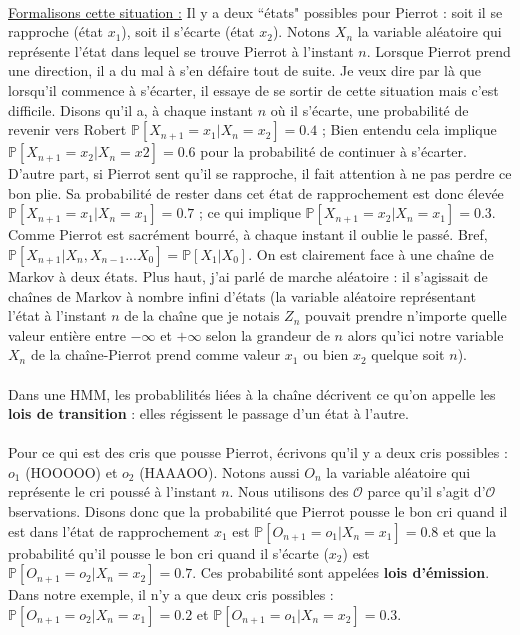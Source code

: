 \documentclass{article}
\begin{document}
\\
\underline{Formalisons cette situation :} Il y a deux ``états" possibles pour Pierrot : soit il se rapproche (état $x_1$), soit il s'écarte (état $x_2$). Notons $X_n$ la variable aléatoire qui représente l'état dans lequel se trouve Pierrot à l'instant $n$. Lorsque Pierrot prend une direction, il a du mal à s'en défaire tout de suite. Je veux dire par là que lorsqu'il commence à s'écarter, il essaye de se sortir de cette situation mais c'est difficile. Disons qu'il a, à chaque instant $n$ où il s'écarte, une probabilité de revenir vers Robert $\mathbb{P}[X_{n+1} = x_1 \vert X_n=x_2] = 0.4$ ; Bien entendu cela implique $\mathbb{P}[X_{n+1} = x_2 \vert X_n=x2] = 0.6$ pour la probabilité de continuer à s'écarter. D'autre part, si Pierrot sent qu'il se rapproche, il fait attention à ne pas perdre ce bon plie. Sa probabilité de rester dans cet état de rapprochement est donc élevée $\mathbb{P}[X_{n+1} = x_1 \vert X_n=x_1] = 0.7$ ; ce qui implique $\mathbb{P}[X_{n+1} = x_2 \vert X_n=x_1] = 0.3$. Comme Pierrot est sacrément bourré, à chaque instant il oublie le passé. Bref, $\mathbb{P}[X_{n+1} \vert X_n, X_{n-1} ... X_0] = \mathbb{P}[X_{1} \vert X_0]$. On est clairement face à une chaîne de Markov à deux états. Plus haut, j'ai parlé de marche aléatoire : il s'agissait de chaînes de Markov à nombre infini d'états (la variable aléatoire représentant l'état à l'instant $n$ de la chaîne que je notais $Z_n$ pouvait prendre n'importe quelle valeur entière entre $-\infty$ et $+\infty$ selon la grandeur de $n$ alors qu'ici notre variable $X_n$ de la chaîne-Pierrot prend comme valeur $x_1$ ou bien $x_2$ quelque soit $n$). \\
\\
Dans une HMM, les probablilités liées à la chaîne décrivent ce qu'on appelle les
\textbf{lois de transition} : elles régissent le passage d'un état à l'autre. \\
\\
Pour ce qui est des cris que pousse Pierrot, écrivons qu'il y a deux cris  possibles : $o_1$ (HOOOOO) et $o_2$ (HAAAOO). Notons aussi $O_n$ la variable aléatoire qui représente le cri poussé à l'instant $n$. Nous utilisons des $\mathcal{O}$ parce qu'il s'agit d'$\mathcal{O}$bservations. Disons donc que la probabilité que Pierrot pousse le bon cri quand il est dans l'état de rapprochement $x_1$ est $\mathbb{P}[O_{n+1} = o_1 \vert X_n=x_1] = 0.8$ et que la probabilité qu'il pousse le bon cri quand il s'écarte ($x_2$) est $\mathbb{P}[O_{n+1} = o_2 \vert X_n=x_2] = 0.7$. Ces probabilité sont appelées \textbf{lois d'émission}. Dans notre exemple, il n'y a que deux cris possibles : $\mathbb{P}[O_{n+1} = o_2 \vert X_n=x_1] = 0.2$ et $\mathbb{P}[O_{n+1} = o_1 \vert X_n=x_2] = 0.3$. \\
\end{document}
